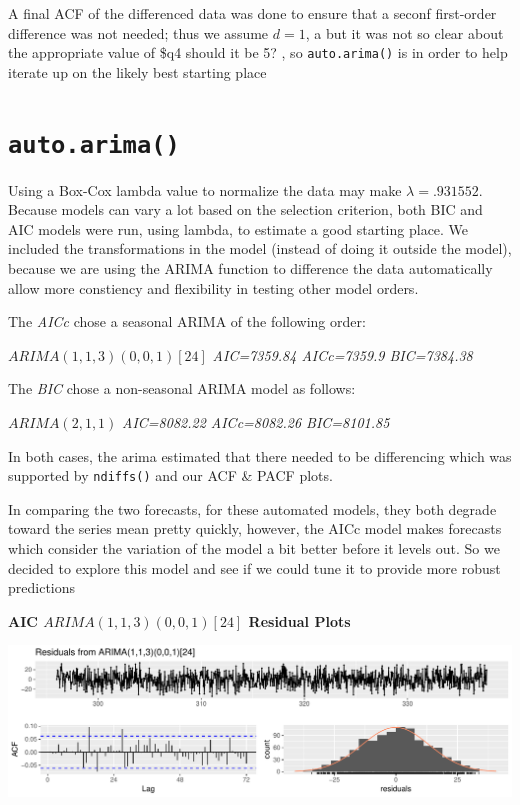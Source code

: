 \documentclass[openany]{book}
\begin{document}
A final ACF of the differenced data was done to ensure that a seconf
first-order difference was not needed; thus we assume \(d = 1\), a but
it was not so clear about the appropriate value of \$q4 should it be 5?
, so \texttt{auto.arima()} is in order to help iterate up on the likely
best starting place

\hypertarget{auto.arima}{%
\section{\texorpdfstring{\texttt{auto.arima()}}{auto.arima()}}\label{auto.arima}}

Using a Box-Cox lambda value to normalize the data may make
\(\lambda= .931552\). Because models can vary a lot based on the
selection criterion, both BIC and AIC models were run, using lambda, to
estimate a good starting place. We included the transformations in the
model (instead of doing it outside the model), because we are using the
ARIMA function to difference the data automatically allow more
constiency and flexibility in testing other model orders.

The \emph{AICc} chose a seasonal ARIMA of the following order:

\(ARIMA(1,1,3)(0,0,1)[24]\) \emph{AIC=7359.84 AICc=7359.9 BIC=7384.38}

The \emph{BIC} chose a non-seasonal ARIMA model as follows:

\(ARIMA(2,1,1)\) \emph{AIC=8082.22 AICc=8082.26 BIC=8101.85}

In both cases, the arima estimated that there needed to be differencing
which was supported by \texttt{ndiffs()} and our ACF \& PACF plots.

In comparing the two forecasts, for these automated models, they both
degrade toward the series mean pretty quickly, however, the AICc model
makes forecasts which consider the variation of the model a bit better
before it levels out. So we decided to explore this model and see if we
could tune it to provide more robust predictions

\textbf{AIC \(ARIMA(1,1,3)(0,0,1)[24]\) Residual Plots}

\includegraphics{Part-C-BP_files/figure-latex/unnamed-chunk-7-1.pdf}
\end{document}
